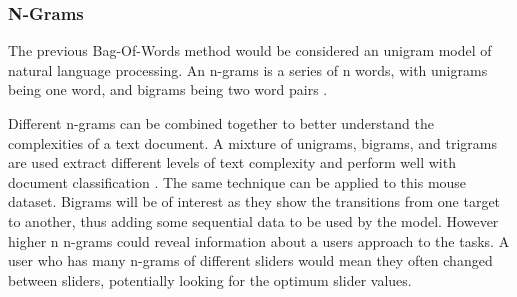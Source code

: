 \documentclass{article}
\begin{document}

\subsubsection{N-Grams}

The previous Bag-Of-Words method would be considered an unigram model of natural language processing.
An n-grams is a series of n words, with unigrams being one word, and bigrams being two word pairs \cite{keselj2009speech}.

Different n-grams can be combined together to better understand the complexities of a text document.
A mixture of unigrams, bigrams, and trigrams are used extract different levels of text complexity and perform well with document classification \cite{aggarwal2012survey}.
The same technique can be applied to this mouse dataset.
Bigrams will be of interest as they show the transitions from one target to another, thus adding some sequential data to be used by the model.
However higher n n-grams could reveal information about a users approach to the tasks.
A user who has many n-grams of different sliders would mean they often changed between sliders, potentially looking for the optimum slider values.
\end{document}
